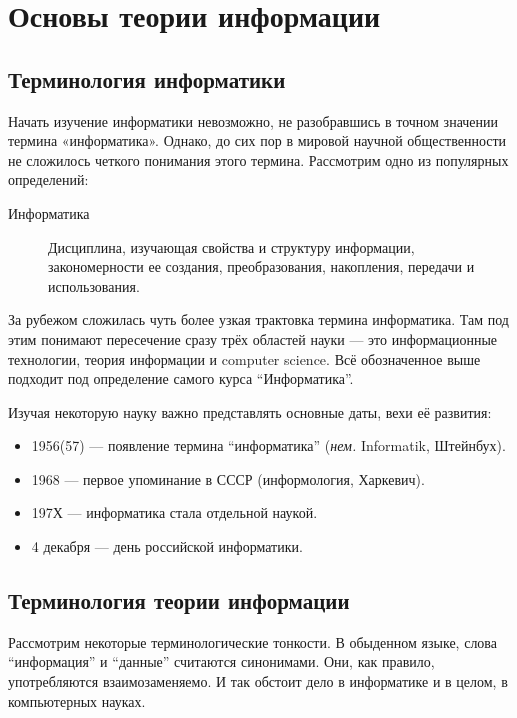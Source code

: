\section{Основы теории информации}\label{sec:theory}

\subsection{Терминология информатики}\label{subsec:computer-science-terminology}

Начать изучение информатики невозможно, не разобравшись в точном значении термина «информатика». Однако, до сих пор в мировой научной общественности не сложилось четкого понимания этого термина. Рассмотрим одно из популярных определений:

\begin{description}
    \item [Информатика]
          Дисциплина, изучающая свойства и структуру информации, закономерности ее создания, преобразования, накопления, передачи и использования.
\end{description}

За рубежом сложилась чуть более узкая трактовка термина информатика. Там под этим понимают пересечение сразу трёх областей науки --- это информационные технологии, теория информации и computer science. Всё обозначенное выше подходит под определение самого курса \enquote{Информатика}.

Изучая некоторую науку важно представлять основные даты, вехи её развития:
\begin{itemize}
    \item 1956(57) --- появление термина \enquote{информатика} (\textit{нем.} Informatik, Штейнбух).
    \item 1968 --- первое упоминание в СССР (информология, Харкевич).
    \item 197Х --- информатика стала отдельной наукой.
    \item 4 декабря --- день российской информатики.
\end{itemize}

\subsection{Терминология теории информации}\label{subsec:information-theory-terminology}

Рассмотрим некоторые терминологические тонкости. В обыденном языке, слова \enquote{информация} и \enquote{данные} считаются синонимами. Они, как правило, употребляются взаимозаменяемо. И так обстоит дело в информатике и в целом, в компьютерных науках.

